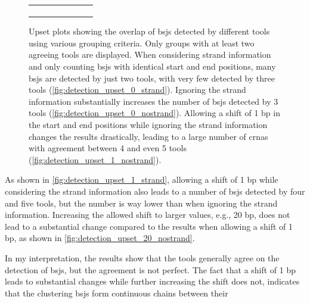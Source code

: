 \begin{figure}[ht]
\begin{tabular}{cc}
{\begin{subfigure}{\textwidth}
                       \end{subfigure}}\end{tabular} \caption{Upset plots
        showing the overlap of
        \gls{bsj}s detected by different tools using various grouping criteria.
        Only groups with at least two agreeing tools are displayed.
        When considering strand information and only counting \gls{bsj}s with identical
        start and end positions, many \gls{bsj}s are detected by just two tools, with
        very few detected by three tools (\cref{fig:detection_upset_0_strand}).
        Ignoring the strand information substantially increases the number of
        \gls{bsj}s detected by 3 tools (\cref{fig:detection_upset_0_nostrand}).
        Allowing a shift of 1 bp in the start and end positions while ignoring the
        strand information changes the results drastically, leading to a large number
        of \gls{crna}s with agreement between 4 and even 5 tools
        (\cref{fig:detection_upset_1_nostrand}).
    }
    \label{fig:detection_upset}
\end{figure}

As shown in \cref{fig:detection_upset_1_strand}, allowing a shift of 1 bp while
considering the strand information also leads to a number of \gls{bsj}s
detected by four and five tools, but the number is way lower than when ignoring
the strand information.
Increasing the allowed shift to larger values, e.g., 20 bp, does not lead to a
substantial change compared to the results when allowing a shift of 1 bp, as
shown in \cref{fig:detection_upset_20_nostrand}.

In my interpretation, the results show that the tools generally agree on the
detection of \gls{bsj}s, but the agreement is not perfect.
The fact that a shift of 1 bp leads to substantial changes while further
increasing the shift does not, indicates that the clustering \gls{bsj}s form
continuous chains between their 

